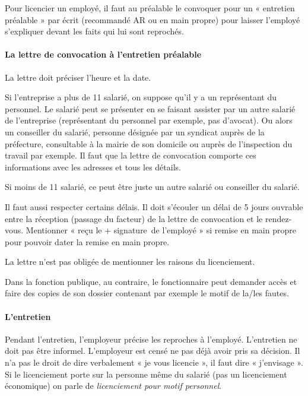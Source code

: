 Pour licencier un employé, il faut au préalable le convoquer pour un « entretien préalable » par écrit (recommandé AR ou en main propre) pour laisser l’employé s’expliquer devant les faits qui lui sont reprochés.

\paragraph{La lettre de convocation à l'entretien préalable}

La lettre doit préciser l’heure et la date.

Si l’entreprise a plus de 11 salarié, on suppose qu’il y a un représentant du personnel.
Le salarié peut se présenter en se faisant assister par un autre salarié de l’entreprise (représentant du personnel par exemple, pas d’avocat).
Ou alors un conseiller du salarié, personne désignée par un syndicat auprès de la préfecture, consultable à la mairie de son domicile ou auprès de l’inspection du travail par exemple.
Il faut que la lettre de convocation comporte ces informations avec les adresses et tous les détails.

Si moins de 11 salarié, ce peut être juste un autre salarié ou conseiller du salarié.

Il faut aussi respecter certains délais.
Il doit s’écouler un délai de 5 jours ouvrable entre la réception (passage du facteur) de la lettre de convocation et le rendez-vous.
Mentionner « reçu le + signature de l’employé » si remise en main propre pour pouvoir dater la remise en main propre.

La lettre n’est pas obligée de mentionner les raisons du licenciement.

Dans la fonction publique, au contraire, le fonctionnaire peut demander accès et faire des copies de son dossier contenant par exemple le motif de la/les fautes.


\paragraph{L'entretien}

Pendant l’entretien, l’employeur précise les reproches à l’employé.
L'entretien ne doit pas être informel.
L’employeur est censé ne pas déjà avoir pris sa décision.
Il n’a pas le droit de dire verbalement « je vous licencie », il faut dire « j’envisage ».
Si le licenciement porte sur la personne même du salarié (pas un licenciement économique) on parle de \textit{licenciement pour motif personnel}.

